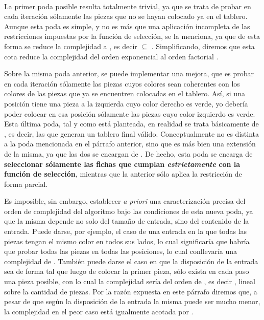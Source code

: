 \documentclass[11pt, a4paper, twoside]{article}
\begin{document}
\begin{paragraph}\


La primer poda posible resulta totalmente trivial, ya que se trata de probar
en cada iteración sólamente las piezas que no se hayan colocado ya en el
tablero. Aunque esta poda es simple, y no es más que una aplicación incompleta
de las restricciones impuestas por la función de selección, se la menciona, ya
que de esta forma se reduce la complejidad a
, es decir 
$\subseteq$ . Simplificando, diremos que esta cota reduce la
complejidad del orden exponencial  al orden factorial .

Sobre la misma poda anterior, se puede implementar una mejora, que es probar
en cada iteración sólamente las piezas cuyos colores sean coherentes con los
colores de las piezas que ya se encuentren colocadas en el tablero. Así, si
una posición tiene una pieza a la izquierda cuyo color derecho es verde, yo
debería poder colocar en esa posición sólamente las piezas cuyo color
izquierdo es verde. Esta última poda, tal y como está planteada, en realidad
se trata básicamente de \textbf{}, es decir, las que generan un
tablero final válido. Conceptualmente no es distinta a la poda mencionada en
el párrafo anterior, sino que es más bien una extensión de la misma, ya que
las dos se encargan de . De hecho, esta poda
se encarga de \textbf{seleccionar sólamente las fichas que cumplan
\emph{estrictamente} con la función de selección}, mientras que la anterior
sólo aplica la restricción de forma parcial.

Es imposible, sin embargo, establecer \emph{a priori} una caracterización
precisa del orden de complejidad del algoritmo bajo las condiciones de esta
nueva poda, ya que la misma depende no solo del tamaño de entrada, sino del
contenido de la entrada. Puede darse, por ejemplo, el caso de una entrada en la
que todas las piezas tengan el mismo color en todos sus lados, lo cual
significaría que habría que probar todas las piezas en todas las posiciones, lo
cual conllevaría una complejidad de . También puede darse el caso en
que la disposición de la entrada sea de forma tal que luego de colocar la primer
pieza, sólo exista en cada paso una pieza posible, con lo cual la complejidad
sería del orden de , es decir , lineal sobre la
cantidad de piezas. Por la razón expuesta en este párrafo diremos que, a pesar
de que según la disposición de la entrada la misma puede ser mucho menor, la
complejidad en el peor caso está igualmente acotada por .


\end{paragraph}
\end{document}
